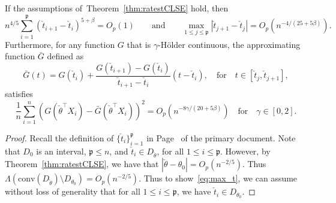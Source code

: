 {
\begin{lemma}[Property of $\{\check{t}_i\}_{i=1}^\mathfrak{p}$]\label{lem:t_check_max} If the assumptions of~Theorem~\ref{thm:ratestCLSE} hold, then
\begin{equation}\label{eq:max_t}
n^{4/5}\sum_{i=1}^\mathfrak{p} (\check{t}_{i+1}- \check{t}_{i})^{5+\beta} =O_p(1) \qquad \text{and} \qquad \max_{1\le j\le \mathfrak{p}}|\check{t}_{j+1} - \check{t}_j| = O_p(n^{-4/(25 + 5\beta)}).
\end{equation}
Furthermore, for any function $G$ that is $\gamma$-H{\"o}lder continuous, the approximating function $\bar{G}$ defined as
\[
\bar{G}(t) = G(\check{t}_i) + \frac{G(\check{t}_{i+1}) - G(\check{t}_{i})}{\check{t}_{i+1} - \check{t}_i}(t - \check{t}_i),\quad\mbox{for}\quad t\in[\check{t}_j, \check{t}_{j+1}],
\]
satisfies
{ \[
\frac{1}{n}\sum_{i=1}^n \left(G(\check{\theta}^{\top}X_i) - \bar{G}(\check{\theta}^{\top}X_i)\right)^2 = O_p(n^{-8\gamma/(20+5\beta)})\quad\mbox{for}\quad \gamma\in[0,2].
\]}
\end{lemma}
\begin{proof}
Recall the definition of $\{\check{t}_i\}_{i=1}^\mathfrak{p}$ in Page~\pageref{eq:X_m_def} of the primary document. Note that $D_0$ is an interval, $\mathfrak{p}\le n$, and $\check{t}_i\in D_{\check{\theta}}$, for all $1\le i\le \mathfrak{p}$. However, by Theorem~\ref{thm:ratestCLSE}, we have that $|\check{\theta}-\theta_0| =O_p(n^{-2/5})$. Thus $\Lambda(\text{conv}(D_{\check{\theta}})\setminus D_{\theta_0}) = O_p(n^{-2/5})$. Thus to show~\eqref{eq:max_t}, we can assume without loss of generality that for all $1\le i\le \mathfrak{p}$, we have $\check{t}_i\in D_{\theta_0}.$



\end{proof}}
